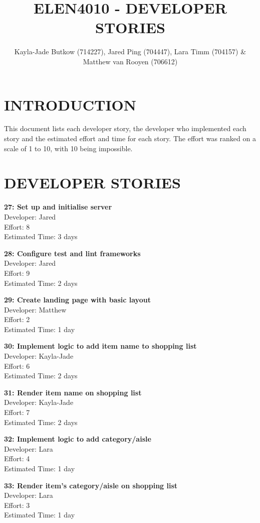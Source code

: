 \documentclass[10pt,onecolumn]{witseiepaper}
\title{ELEN4010 - DEVELOPER STORIES}
\author{Kayla-Jade Butkow (714227), Jared Ping (704447), Lara Timm (704157) \& Matthew van Rooyen (706612)}
\begin{document}
	\maketitle
	\pagestyle{plain}
	\setcounter{page}{1}
	
\section*{INTRODUCTION}
This document lists each developer story, the developer who implemented each story and the estimated effort and time for each story. The effort was ranked on a scale of 1 to 10, with 10 being impossible.

\section*{DEVELOPER STORIES}
\textbf{27: Set up and initialise server} \\
Developer: Jared\\
Effort: 8\\
Estimated Time: 3 days

\textbf{28: Configure test and lint frameworks} \\
Developer: Jared \\
Effort: 9 \\
Estimated Time: 2 days

\textbf{29: Create landing page with basic layout} \\
Developer: Matthew \\
Effort: 2\\
Estimated Time: 1 day

\textbf{30: Implement logic to add item name to shopping list} \\
Developer: Kayla-Jade\\
Effort: 6\\
Estimated Time: 2 days

\textbf{31: Render item name on shopping list} \\
Developer: Kayla-Jade\\
Effort: 7\\
Estimated Time: 2 days

\textbf{32: Implement logic to add category/aisle} \\
Developer: Lara \\
Effort: 4\\
Estimated Time: 1 day

\textbf{33: Render item's category/aisle on shopping list} \\
Developer: Lara\\
Effort: 3\\
Estimated Time: 1 day
\end{document}
